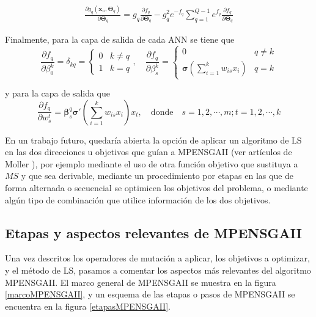\begin{gather} \nonumber
\frac{\partial g_{q}\left(\mathbf{x}_{n} ,\mathbf{\Theta}_{q}\right)} {\partial
\mathbf{\Theta}_{q}} = g_{q}\frac{\partial f_{q}}{\partial\mathbf{\Theta}_{q}} - g_{q}^2
e^{-f_{q}} \sum_{q=1}^{Q-1} e^{f_{q}} \frac{\partial
f_{q}}{\partial\mathbf{\Theta}_{q}}
\end{gather}

Finalmente, para la capa de salida de cada ANN se tiene que
\begin{equation*}
	\frac{\partial f_{q}}{\partial \beta_{0}^k}=\delta_{kq}=
	\begin{cases}
		0 & k\neq q \\
		1 & k=q
	\end{cases}, \quad
	\frac{\partial f_{q}}{\partial \beta_{s}^k}=
	\begin{cases}
	0 & q\neq k \\
	\mathbf{\sigma}\left( \sum_{i=1}^k w_{is}x_{i}\right)  & q=k
	\end{cases}
\end{equation*}

y para la capa de salida que
\begin{displaymath}
\frac{\partial f_{q}}{\partial w_{s}^t} = \mathbf{\beta}_{s}^q \mathbf{\sigma}'\left(
\sum_{i=1}^k w_{is}x_{i}\right) x_{t},\quad \text{donde} \quad
s=1,2,\cdots,m;t=1,2,\cdots,k
\end{displaymath}

En un trabajo futuro, quedaría abierta la opción de aplicar un algoritmo de LS en las dos
direcciones u objetivos que guían a MPENSGAII (ver artículos
de Moller \cite{Moller1993,Falas2005}), por ejemplo mediante el uso de otra función
objetivo que sustituya a $MS$ y que sea derivable, mediante un procedimiento por etapas en
las que de forma alternada o secuencial se optimicen los objetivos del problema, o
mediante algún tipo de combinación que utilice información de los dos objetivos.

\subsection{Etapas y aspectos relevantes de MPENSGAII}\label{etapas}
\noindent Una vez descritos los operadores de mutación a aplicar, los objetivos a
optimizar, y el método de LS, pasamos a comentar los aspectos más relevantes del algoritmo
MPENSGAII. El marco general de MPENSGAII se muestra en la figura \ref{marcoMPENSGAII}, y
un esquema de las etapas o pasos de MPENSGAII se encuentra en la figura
\ref{etapasMPENSGAII}.

